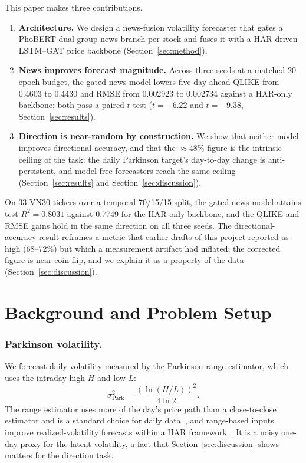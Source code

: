 \documentclass[runningheads]{llncs}
\newcommand{\qlikeHAR}{0.4603}
\newcommand{\qlikeNews}{0.4430}
\newcommand{\qliketstat}{-6.22}
\newcommand{\rmseHAR}{0.002923}
\newcommand{\rmseNews}{0.002734}
\newcommand{\rmsetstat}{-9.38}
\newcommand{\rsqHAR}{0.7749}
\newcommand{\rsqNews}{0.8031}
\newcommand{\ntick}{33}
\begin{document}
This paper makes three contributions.
\begin{enumerate}
\item \textbf{Architecture.} We design a news-fusion volatility forecaster that gates a PhoBERT
dual-group news branch per stock and fuses it with a HAR-driven LSTM--GAT price backbone
(Section~\ref{sec:method}).
\item \textbf{News improves forecast magnitude.} Across three seeds at a matched 20-epoch budget,
the gated news model lowers five-day-ahead QLIKE from \qlikeHAR{} to \qlikeNews{} and RMSE from
\rmseHAR{} to \rmseNews{} against a HAR-only backbone; both pass a paired $t$-test
($t=\qliketstat$ and $t=\rmsetstat$, Section~\ref{sec:results}).
\item \textbf{Direction is near-random by construction.} We show that neither model improves
directional accuracy, and that the $\approx 48\%$ figure is the intrinsic ceiling of the task:
the daily Parkinson target's day-to-day change is anti-persistent, and model-free forecasters reach
the same ceiling (Section~\ref{sec:results} and Section~\ref{sec:discussion}).
\end{enumerate}

On \ntick{} VN30 tickers over a temporal 70/15/15 split, the gated news model attains test
$R^2=\rsqNews$ against \rsqHAR{} for the HAR-only backbone, and the QLIKE and RMSE gains hold in the
same direction on all three seeds. The directional-accuracy result reframes a metric that earlier
drafts of this project reported as high (68--72\%) but which a measurement artifact had inflated;
the corrected figure is near coin-flip, and we explain it as a property of the data
(Section~\ref{sec:discussion}).

\section{Background and Problem Setup}
\label{sec:background}

\subsubsection{Parkinson volatility.}
We forecast daily volatility measured by the Parkinson range estimator, which uses the intraday
high $H$ and low $L$:
\begin{equation}
\sigma^2_{\text{Park}} = \frac{\left(\ln(H/L)\right)^2}{4\ln 2}.
\label{eq:parkinson}
\end{equation}
The range estimator uses more of the day's price path than a close-to-close estimator and is a
standard choice for daily data~\cite{parkinson1980}, and range-based inputs improve
realized-volatility forecasts within a HAR framework~\cite{korkusuz2023}. It is a noisy one-day
proxy for the latent volatility, a fact that Section~\ref{sec:discussion} shows matters for the
direction task.
\end{document}
